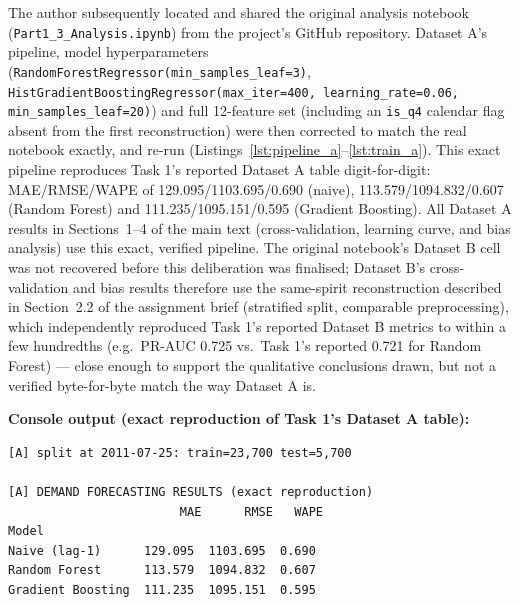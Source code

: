 The author subsequently located and shared the original analysis notebook
(\texttt{Part1\_3\_Analysis.ipynb}) from the project's GitHub repository. Dataset A's pipeline,
model hyperparameters (\texttt{RandomForestRegressor(min\_samples\_leaf=3)},
\texttt{HistGradientBoostingRegressor(max\_iter=400, learning\_rate=0.06, min\_samples\_leaf=20)})
and full 12-feature set (including an \texttt{is\_q4} calendar flag absent from the first
reconstruction) were then corrected to match the real notebook exactly, and re-run
(Listings~\ref{lst:pipeline_a}--\ref{lst:train_a}). This exact pipeline reproduces Task 1's
reported Dataset A table digit-for-digit: MAE/RMSE/WAPE of 129.095/1103.695/0.690 (naive),
113.579/1094.832/0.607 (Random Forest) and 111.235/1095.151/0.595 (Gradient Boosting). All
Dataset A results in Sections~1--4 of the main text (cross-validation, learning curve, and bias
analysis) use this exact, verified pipeline. The original notebook's Dataset B cell was not
recovered before this deliberation was finalised; Dataset B's cross-validation and bias results
therefore use the same-spirit reconstruction described in Section~2.2 of the assignment brief
(stratified split, comparable preprocessing), which independently reproduced Task 1's reported
Dataset B metrics to within a few hundredths (e.g.\ PR-AUC 0.725 vs.\ Task 1's reported 0.721 for
Random Forest) --- close enough to support the qualitative conclusions drawn, but not a verified
byte-for-byte match the way Dataset A is.





\textbf{Console output (exact reproduction of Task 1's Dataset A table):}
\begin{lstlisting}
[A] split at 2011-07-25: train=23,700 test=5,700

[A] DEMAND FORECASTING RESULTS (exact reproduction)
                        MAE      RMSE   WAPE
Model
Naive (lag-1)      129.095  1103.695  0.690
Random Forest      113.579  1094.832  0.607
Gradient Boosting  111.235  1095.151  0.595
\end{lstlisting}

